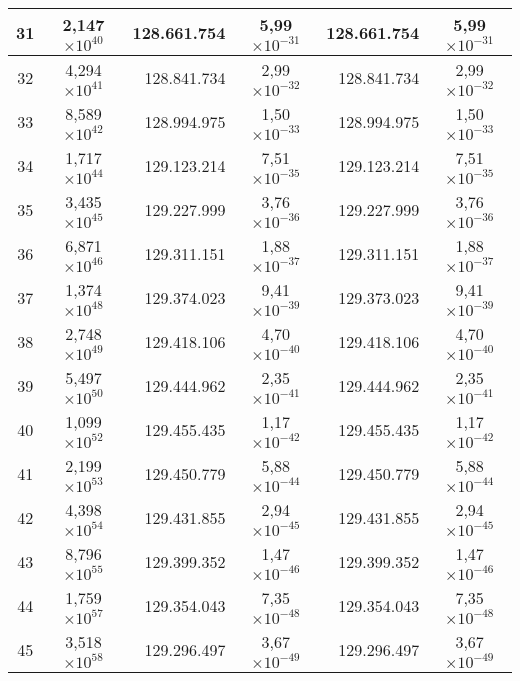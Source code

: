 \begin{table}[!hbt]
\begin{tabular}{| c  r  r  c  r  c |}
    31 & \multicolumn{1}{c}{2,147$\times 10^{40}$} & 128.661.754 & 5,99$\times 10^{-31}$ & 128.661.754 & 5,99$\times 10^{-31}$ \\ \hline
    32 & \multicolumn{1}{c}{4,294$\times 10^{41}$} & 128.841.734 & 2,99$\times 10^{-32}$ & 128.841.734 & 2,99$\times 10^{-32}$ \\ \hline  
    33 & \multicolumn{1}{c}{8,589$\times 10^{42}$} & 128.994.975 & 1,50$\times 10^{-33}$ & 128.994.975 & 1,50$\times 10^{-33}$ \\ \hline
    34 & \multicolumn{1}{c}{1,717$\times 10^{44}$} & 129.123.214 & 7,51$\times 10^{-35}$ & 129.123.214 & 7,51$\times 10^{-35}$ \\ \hline  
    35 & \multicolumn{1}{c}{3,435$\times 10^{45}$} & 129.227.999 & 3,76$\times 10^{-36}$ & 129.227.999 & 3,76$\times 10^{-36}$ \\ \hline
    36 & \multicolumn{1}{c}{6,871$\times 10^{46}$} & 129.311.151 & 1,88$\times 10^{-37}$ & 129.311.151 & 1,88$\times 10^{-37}$ \\ \hline  
    37 & \multicolumn{1}{c}{1,374$\times 10^{48}$} & 129.374.023 & 9,41$\times 10^{-39}$ & 129.373.023 & 9,41$\times 10^{-39}$ \\ \hline
    38 & \multicolumn{1}{c}{2,748$\times 10^{49}$} & 129.418.106 & 4,70$\times 10^{-40}$ & 129.418.106 & 4,70$\times 10^{-40}$ \\ \hline  
    39 & \multicolumn{1}{c}{5,497$\times 10^{50}$} & 129.444.962 & 2,35$\times 10^{-41}$ & 129.444.962 & 2,35$\times 10^{-41}$ \\ \hline
    40 & \multicolumn{1}{c}{1,099$\times 10^{52}$} & 129.455.435 & 1,17$\times 10^{-42}$ & 129.455.435 & 1,17$\times 10^{-42}$ \\ \hline  
    41 & \multicolumn{1}{c}{2,199$\times 10^{53}$} & 129.450.779 & 5,88$\times 10^{-44}$ & 129.450.779 & 5,88$\times 10^{-44}$ \\ \hline
    42 & \multicolumn{1}{c}{4,398$\times 10^{54}$} & 129.431.855 & 2,94$\times 10^{-45}$ & 129.431.855 & 2,94$\times 10^{-45}$ \\ \hline  
    43 & \multicolumn{1}{c}{8,796$\times 10^{55}$} & 129.399.352 & 1,47$\times 10^{-46}$ & 129.399.352 & 1,47$\times 10^{-46}$ \\ \hline
    44 & \multicolumn{1}{c}{1,759$\times 10^{57}$} & 129.354.043 & 7,35$\times 10^{-48}$ & 129.354.043 & 7,35$\times 10^{-48}$ \\ \hline  
    45 & \multicolumn{1}{c}{3,518$\times 10^{58}$} & 129.296.497 & 3,67$\times 10^{-49}$ & 129.296.497 & 3,67$\times 10^{-49}$ \\ \hline

\end{tabular}
\end{table}
